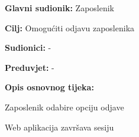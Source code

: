 				\noindent {}
				\begin{packed_item}
					
					\item \textbf{Glavni sudionik:} Zaposlenik
					\item  \textbf{Cilj:} Omogućiti odjavu zaposlenika
					\item  \textbf{Sudionici:} -
					\item  \textbf{Preduvjet:} -
					\item  \textbf{Opis osnovnog tijeka:}
					
					\item[] \begin{packed_enum}
						
						\item Zaposlenik odabire opciju odjave
						\item Web aplikacija završava sesiju
						
					\end{packed_enum}
					
				\end{packed_item}
				
